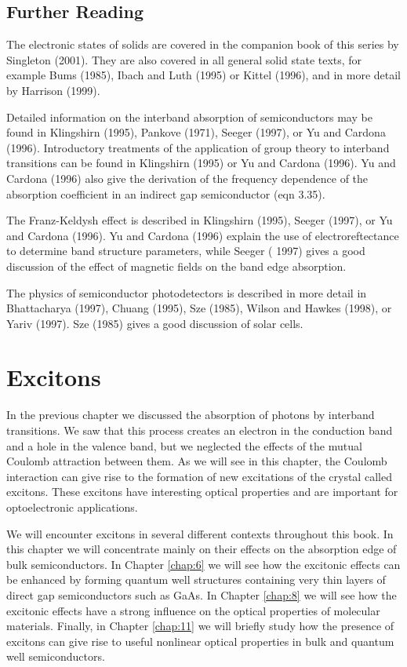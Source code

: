 \documentclass[12pt]{book}
\begin{document}
\section*{Further Reading}
The electronic states of solids are covered in the companion book of this series by Singleton (2001). They are also covered in all general solid state texts, for example Bums (1985), Ibach and Luth (1995) or Kittel (1996), and in more detail by Harrison (1999).

Detailed information on the interband absorption of semiconductors may be found in Klingshirn (1995), Pankove (1971), Seeger (1997), or Yu and Cardona (1996). Introductory treatments of the application of group theory to interband transitions can be found in Klingshirn (1995) or Yu and Cardona (1996). Yu and Cardona (1996) also give the derivation of the frequency dependence of the absorption coefficient in an indirect gap semiconductor (eqn 3.35).

The Franz-Keldysh effect is described in Klingshirn (1995), Seeger (1997), or Yu and Cardona (1996). Yu and Cardona (1996) explain the use of electroreftectance to determine band structure parameters, while Seeger ( 1997) gives a good discussion of the effect of magnetic fields on the band edge absorption.

The physics of semiconductor photodetectors is described in more detail in Bhattacharya (1997), Chuang (1995), Sze (1985), Wilson and Hawkes (1998), or Yariv (1997). Sze (1985) gives a good discussion of solar cells.

\chapter{Excitons}\label{chap:4}
\begin{shaded}

In the previous chapter we discussed the absorption of photons by interband transitions. We saw that this process creates an electron in the conduction band and a hole in the valence band, but we neglected the effects of the mutual Coulomb attraction between them. As we will see in this chapter, the Coulomb interaction can give rise to the formation of new excitations of the crystal called excitons. These excitons have interesting optical properties and are important for optoelectronic applications.

We will encounter excitons in several different contexts throughout this book. In this chapter we will concentrate mainly on their effects on the absorption edge of bulk semiconductors. In Chapter \ref{chap:6} we will see how the excitonic effects can be enhanced by forming quantum well structures containing very thin layers of direct gap semiconductors such as GaAs. In Chapter \ref{chap:8} we will see how the excitonic effects have a strong influence on the optical properties of molecular materials. Finally, in Chapter \ref{chap:11} we will briefly study how the presence of excitons can give rise to useful nonlinear optical properties in bulk and quantum well semiconductors.
\end{shaded}
\end{document}
